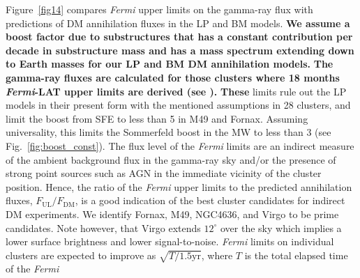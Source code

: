 \documentclass[10pt,aps,pra,reprint,amsmath,amsfonts,amssymb,showpacs,nofootinbib,floatfix]{revtex4-1}
\def\del#1{{}}
\def\C#1{{\bf #1}}
\newcommand{\Fermi}{{\em Fermi}\xspace}
\begin{document}
Figure~\ref{fig14} compares \Fermi upper limits on the gamma-ray flux
with predictions of DM annihilation fluxes in the LP and BM
models. \C{We assume a boost factor due to substructures that has a
  constant contribution per decade in substructure mass and has a mass
  spectrum extending down to Earth masses for our LP and BM DM
  annihilation models.}  \del{In the LP models we additionally assume
  a cluster-mass dependent boost due to SFE.}\C{The gamma-ray fluxes
  are calculated for those clusters where 18 months \Fermi-LAT upper
  limits are derived (see \cite{2010ApJ...717L..71A}).} \del{To obtain
  the gamma-ray fluxes, we scale the virial mass of clusters in the
  extended HIFLUGCS catalogue \cite{2007A&A...466..805C} with our
  scaling relation of Eq.~(\ref{eq:DM_scaling}). In those, we assume a
  boost factor due to substructures that has a constant contribution
  per decade in substructure mass and has a mass spectrum extending
  down to Earth masses for our LP and BM DM annihilation models. In
  the LP models we additionally assume a cluster-mass dependent boost
  due to SFE.}  \del{\Fermi} \C{These} limits rule out the LP models
in their present form with the mentioned assumptions in 28 clusters,
and limit the boost from SFE to less than 5 in M49 and
Fornax. Assuming universality, this limits the Sommerfeld boost in the
MW to less than 3 (see Fig.~\ref{fig:boost_const}). The flux level of
the \Fermi limits are an indirect measure of the ambient background
flux in the gamma-ray sky and/or the presence of strong point sources
such as AGN in the immediate vicinity of the cluster position. Hence,
the ratio of the \Fermi upper limits to the predicted annihilation
fluxes, $F_{\mathrm{UL}}/F_{\mathrm{DM}}$, is a good indication of the
best cluster candidates for indirect DM experiments. We identify
Fornax, M49, NGC4636, and Virgo to be prime candidates. Note however,
that Virgo extends $12^\circ$ over the sky which implies a lower
surface brightness and lower signal-to-noise. \Fermi limits on
individual clusters are expected to improve as $\sqrt{T/1.5
  \mathrm{yr}}$, where $T$ is the total elapsed time of the \Fermi
\end{document}

